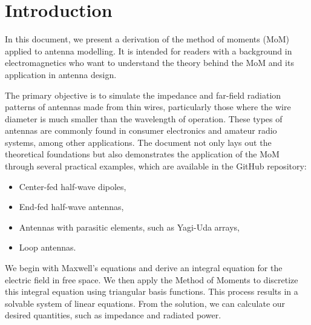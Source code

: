 \clearpage
\section{Introduction}
In this document, we present a derivation of the method of moments (MoM) applied to antenna modelling. It is intended for readers with a background in electromagnetics who want to understand the theory behind the MoM and its application in antenna design.

The primary objective is to simulate the impedance and far-field radiation patterns of antennas made from thin wires, particularly those where the wire diameter is much smaller than the wavelength of operation. These types of antennas are commonly found in consumer electronics and amateur radio systems, among other applications. The document not only lays out the theoretical foundations but also demonstrates the application of the MoM through several practical examples, which are available in the GitHub repository:
\begin{itemize}
	\item Center-fed half-wave dipoles,
	\item End-fed half-wave antennas,
	\item Antennas with parasitic elements, such as Yagi-Uda arrays,
	\item Loop antennas.
\end{itemize}

We begin with Maxwell's equations and derive an integral equation for the electric field in free space. We then apply the Method of Moments to discretize this integral equation using triangular basis functions. This process results in a solvable system of linear equations. From the solution, we can calculate our desired quantities, such as impedance and radiated power.